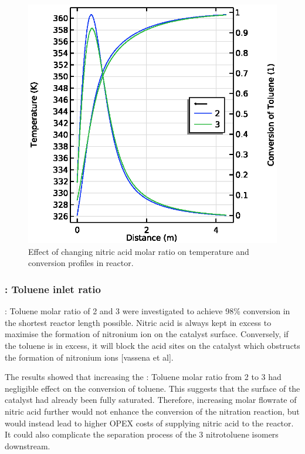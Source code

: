 \begin{figure}[h]
\begin{minipage}[t]{0.47\linewidth}
        \includegraphics[width=\linewidth]{figures/S3-T-X.eps}
        \caption{Effect of changing nitric acid molar ratio on temperature and conversion profiles in reactor.}
        \label{fig:comsol-S3-T-X}
    \end{minipage}
\end{figure}

\subsubsection{ : Toluene inlet ratio}

 : Toluene molar ratio of 2 and 3 were investigated to achieve 98\% conversion in the shortest reactor length possible. Nitric acid is always kept in excess to maximise the formation of nitronium ion on the catalyst surface. Conversely, if the toluene is in excess, it will block the acid sites on the catalyst which obstructs the formation of nitronium ions [vassena et al]. 

The results showed that increasing the  : Toluene molar ratio from 2 to 3 had negligible effect on the conversion of toluene. This suggests that the surface of the catalyst had already been fully saturated. Therefore, increasing molar flowrate of nitric acid further would not enhance the conversion of the nitration reaction, but would instead lead to higher OPEX costs of supplying nitric acid to the reactor. It could also complicate the separation process of the 3 nitrotoluene isomers downstream. 

